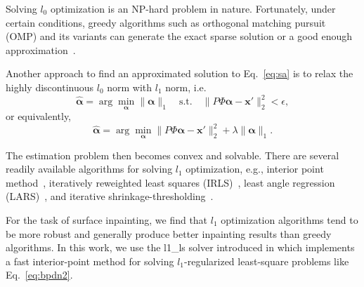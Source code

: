 Solving $l_0$ optimization is an NP-hard problem in nature.
Fortunately, under certain conditions, greedy algorithms such as
orthogonal matching pursuit (OMP) and its variants can generate the
exact sparse solution or a good enough
approximation~\cite{Needell2010,Tropp2007}.

Another approach to find an approximated solution to Eq.~\ref{eq:sa}
is to relax the highly discontinuous $l_0$ norm with $l_1$ norm, i.e.
\begin{equation}
\label{eq:bpdn}
\hat{\mathbf{\alpha}} = \arg\min_{\mathbf{\alpha}} \|\mathbf{\alpha}\|_1 \quad \text{s.t.} \quad \|P\Phi\mathbf{\alpha} - \mathbf{x}'\|_2^2 < \epsilon,
\end{equation}
or equivalently,
\begin{equation}
\label{eq:bpdn2}
\hat{\mathbf{\alpha}} = \arg\min_{\mathbf{\alpha}} \|P\Phi\mathbf{\alpha} - \mathbf{x}'\|_2^2 + \lambda\|\mathbf{\alpha}\|_1.
\end{equation}

The estimation problem then becomes convex and solvable. There are
several readily available algorithms for solving $l_1$ optimization,
e.g., interior point method~\cite{Kim2007}, iteratively reweighted
least squares (IRLS)~\cite{Holland1977}, least angle regression
(LARS)~\cite{Sorkine2004}, and iterative
shrinkage-thresholding~\cite{Daubechies2004}.

For the task of surface inpainting, we find that $l_1$ optimization algorithms tend to be
more robust and generally produce better inpainting results than greedy algorithms. In this work,
we use the l1\_ls solver introduced in \cite{Kim2007} which implements a fast interior-point method
for solving $l_1$-regularized least-square problems like Eq.~\ref{eq:bpdn2}.

